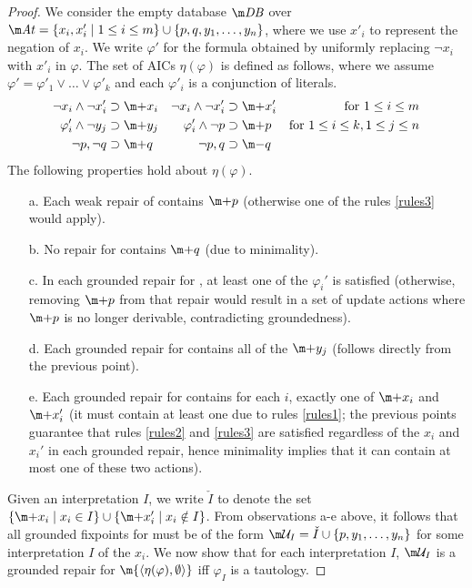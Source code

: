 \begin{proof}
  We consider the empty database $\db$ over $\atoms=\{x_i,x'_i\mid 1\leq i\leq m\}\cup\{p,q,y_1,\ldots,y_n\}$, where we use $x'_i$ to represent the negation of $x_i$.  We write $\varphi'$ for the formula obtained by uniformly replacing $\neg x_i$ with $x'_i$ in $\varphi$.  The set of AICs $\eta(\varphi)$ is defined as follows, where we assume $\varphi'=\varphi'_1\lor\ldots\lor \varphi'_k$ and each $\varphi'_i$ is a conjunction of literals.
  \begin{align}
    \neg x_i\land\neg x'_i &\aicrule \add x_i & \neg x_i\land\neg x'_i &\aicrule \add x'_i & \text{for } 1\leq i\leq m & \label{rules1} \\
    \varphi'_i\land\neg y_j &\aicrule \add y_j & \varphi'_i \land \neg p &\aicrule \add p & \text{for }1\leq i\leq k, 1\leq j\leq n & \label{rules2} \\
    \neg p,\neg q &\aicrule \add q & \neg p,q &\aicrule \remove q & \label{rules3}
  \end{align}
  The following properties hold about $\eta(\varphi)$.
  \newcommand\dbhere{\m{\langle\eta(\varphi),\emptyset\rangle}}
  \begin{itemize}
   \item[a.] Each weak repair of \dbhere contains $\add p$ (otherwise one of the rules \ref{rules3} would apply).
   \item[b.] No repair  for \dbhere contains $\add q$ (due to minimality). 
   \item[c.] In each grounded repair for \dbhere, at least one of the $\varphi_i'$ is satisfied (otherwise, removing $\add p$ from that repair would result in a set of update actions where $\add p$ is no longer derivable, contradicting groundedness). 
   \item[d.] Each grounded repair for \dbhere contains all of the $\add y_j$ (follows directly from the previous point). 
   \item[e.] Each grounded repair for \dbhere contains for each $i$, exactly one of $\add x_i$ and $\add x_i'$ (it must contain at least one due to rules \ref{rules1}; the previous points guarantee that rules \ref{rules2} and \ref{rules3} are satisfied regardless of the $x_i$ and $x_i'$ in each grounded repair, hence minimality implies that it can contain at most one of these two actions). 	
  \end{itemize}
  Given an interpretation $I$, we write $\check I$ to denote the set $\{\add x_i\mid x_i\in I\}\cup\{\add x'_i\mid x_i\notin I\}$.
  From observations a-e above, it follows that all grounded fixpoints for \dbhere must be of the form  $\UU_I=\check I\cup\{p,y_1,\ldots,y_n\}$ for some interpretation $I$ of the $x_i$. We now show that for each interpretation $I$, $\UU_I$ is a grounded repair for $\dbhere$ iff $\varphi_I$ is a tautology. 

\end{proof}

